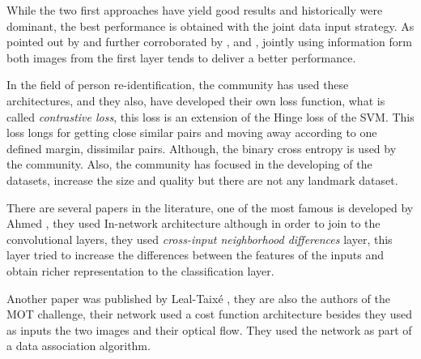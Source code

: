 While the two first approaches have yield good results and historically were dominant, the best performance is obtained with the joint data input strategy. As pointed out by  \cite{patch1} and further corroborated by \cite{patch2}, and \cite{patch3}, jointly using information form both images from the first layer tends to deliver a better performance. 


In the field of person re-identification, the community has used these architectures, and they also, have developed their own loss function, what is called \textit{contrastive loss}, this loss is an extension of the Hinge loss of the SVM. This loss longs for getting close similar pairs and moving away according to one defined margin, dissimilar pairs. Although, the binary cross entropy is used by the community. Also, the community has focused in the developing of the datasets, increase the size and quality but there are not any landmark dataset.


There are several papers in the literature, one of the most famous is developed by Ahmed \cite{ahmed}, they used In-network architecture although in order to join to the convolutional layers, they used \textit{cross-input neighborhood differences} layer, this layer tried to increase the differences between the features of the inputs and obtain richer representation to the classification layer.

Another paper was published by Leal-Taixé \cite{lealTaixe}, they are also the authors of the MOT challenge, their network used a cost function architecture besides they used as inputs the two images and their optical flow. They used the network as part of a data association algorithm.


